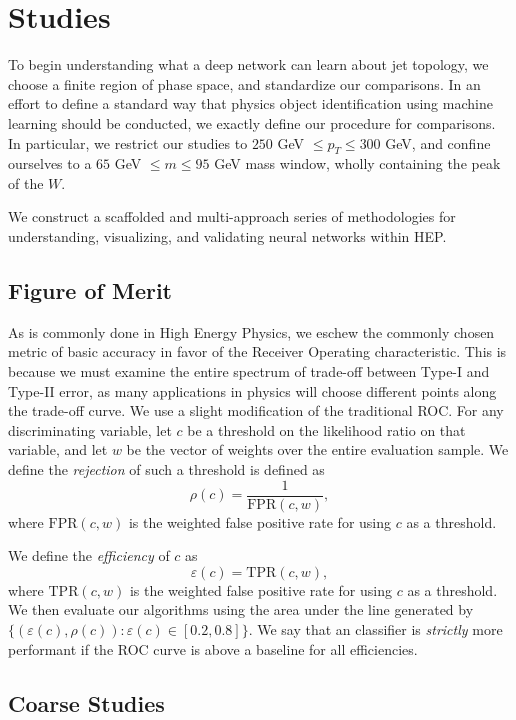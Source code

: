 \section{Studies} %
\label{sec:studies}

To begin understanding what a deep network can learn about jet topology, we choose a finite region of phase space, and standardize our comparisons. In an effort to define a standard way that physics object identification using machine learning should be conducted, we exactly define our procedure for comparisons. In particular, we restrict our studies to $250$ GeV $\leq p_T \leq 300$ GeV, and confine ourselves to a $65$ GeV $\leq m \leq 95$ GeV mass window, wholly containing the peak of the $W$. 

We construct a scaffolded and multi-approach series of methodologies for understanding, visualizing, and validating neural networks within HEP.

\subsection{Figure of Merit} %
\label{sec:figure_of_merit}

As is commonly done in High Energy Physics, we eschew the commonly chosen metric of basic accuracy in favor of the Receiver Operating characteristic. This is because we must examine the entire spectrum of trade-off between Type-I and Type-II error, as many applications in physics will choose different points along the trade-off curve. We use a slight modification of the traditional ROC. For any discriminating variable, let $c$ be a threshold on the likelihood ratio on that variable, and let $w$ be the vector of weights over the entire evaluation sample. We define the \emph{rejection} of such a threshold is defined as 
$$
    \rho(c) = \frac{1}{\text{FPR}(c, w)},
$$
where $\text{FPR}(c, w)$ is the weighted false positive rate for using $c$ as a threshold.

We define the \emph{efficiency} of $c$ as 
$$
    \varepsilon(c) = \text{TPR}(c, w),
$$
where $\text{TPR}(c, w)$ is the weighted false positive rate for using $c$ as a threshold. We then evaluate our algorithms using the area under the line generated by $\{(\varepsilon(c), \rho(c)) : \varepsilon(c)\in [0.2, 0.8]\}$. We say that an classifier is \emph{strictly} more performant if the ROC curve is above a baseline for all efficiencies.



\subsection{Coarse Studies} %
\label{sub:coarse_studies}


